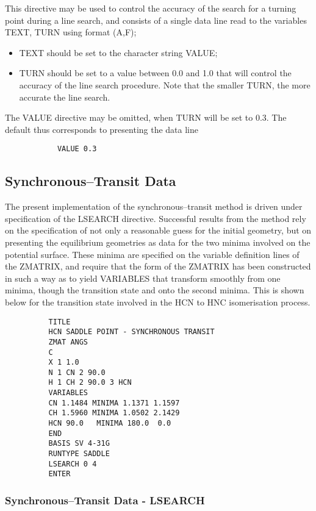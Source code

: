 \documentclass[11pt,fleqn]{article}
\begin{document}
This directive may be used to 
control the accuracy of the search for a turning point during
a line search, and consists of a single data line read to
the variables TEXT, TURN using format (A,F);
\begin{itemize}
\item TEXT should be set to the character string VALUE;
\item TURN should be set to a value between 0.0 and 1.0 
that will control the accuracy of the line search procedure. Note
that the smaller TURN, the more accurate the line search.
\end{itemize}
The VALUE directive may be omitted, when TURN will be set to 0.3.
The default thus corresponds to presenting the data line

{
\footnotesize
\begin{verbatim}
            VALUE 0.3
\end{verbatim}
}


\subsection[Synchronous--Transit Data]{Synchronous--Transit Data}

The present implementation of the synchronous--transit method is driven
under specification of the LSEARCH directive. Successful results from
the method rely on the specification of not only a reasonable
guess for the initial geometry, but on presenting the equilibrium
geometries as data for the two minima involved on the potential
surface. These minima are specified on the variable definition 
lines of the
ZMATRIX, and require that the form of the ZMATRIX has been
constructed in such a way as to yield VARIABLES that transform
smoothly from one minima, though the transition state and onto
the second minima. This is shown below for the transition state
involved in the HCN to HNC isomerisation process.

{
\footnotesize
\begin{verbatim}
          TITLE
          HCN SADDLE POINT - SYNCHRONOUS TRANSIT
          ZMAT ANGS
          C
          X 1 1.0
          N 1 CN 2 90.0
          H 1 CH 2 90.0 3 HCN
          VARIABLES
          CN 1.1484 MINIMA 1.1371 1.1597
          CH 1.5960 MINIMA 1.0502 2.1429
          HCN 90.0   MINIMA 180.0  0.0
          END
          BASIS SV 4-31G
          RUNTYPE SADDLE
          LSEARCH 0 4
          ENTER
\end{verbatim}
}

\subsubsection[Synchronous--Transit Data - LSEARCH]{Synchronous--Transit Data - LSEARCH}
\end{document}
